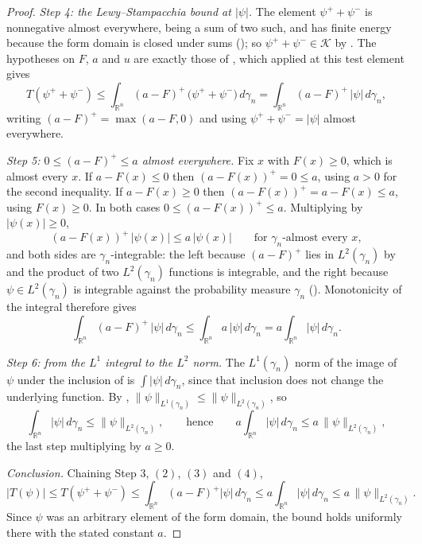 \begin{proof}
\emph{Step 4: the Lewy--Stampacchia bound at $|\psi|$.}
The element $\psi^+ + \psi^-$ is nonnegative almost everywhere, being a sum of two
such, and has finite energy because the form domain is closed under sums
(); so $\psi^+ + \psi^- \in \mathcal{K}$ by
.  The hypotheses on $F$, $a$ and $u$ are exactly those of
, which applied at this test element gives
\begin{equation*}
  T(\psi^+ + \psi^-)
    \leq \int_{\mathbb{R}^n} (a - F)^+ \,\bigl(\psi^+ + \psi^-\bigr) \, d\gamma_n
    = \int_{\mathbb{R}^n} (a - F)^+ \,|\psi| \, d\gamma_n , \tag{2}
\end{equation*}
writing $(a-F)^+ = \max(a-F, 0)$ and using $\psi^+ + \psi^- = |\psi|$ almost
everywhere.

\emph{Step 5: $0 \leq (a-F)^+ \leq a$ almost everywhere.}
Fix $x$ with $F(x) \geq 0$, which is almost every $x$.  If $a - F(x) \leq 0$ then
$(a - F(x))^+ = 0 \leq a$, using $a > 0$ for the second inequality.  If
$a - F(x) \geq 0$ then $(a-F(x))^+ = a - F(x) \leq a$, using $F(x) \geq 0$.  In
both cases $0 \leq (a - F(x))^+ \leq a$.  Multiplying by $|\psi(x)| \geq 0$,
\[
  (a-F(x))^+\,|\psi(x)| \leq a\,|\psi(x)|
  \qquad \text{for } \gamma_n\text{-almost every } x ,
\]
and both sides are $\gamma_n$-integrable: the left because $(a-F)^+$ lies in
$L^2(\gamma_n)$ by  and the product of two
$L^2(\gamma_n)$ functions is integrable, and the right because $\psi \in
L^2(\gamma_n)$ is integrable against the probability measure $\gamma_n$
().  Monotonicity of the integral therefore gives
\begin{equation*}
  \int_{\mathbb{R}^n} (a-F)^+\,|\psi| \, d\gamma_n
    \leq \int_{\mathbb{R}^n} a\,|\psi| \, d\gamma_n
    = a \int_{\mathbb{R}^n} |\psi| \, d\gamma_n . \tag{3}
\end{equation*}

\emph{Step 6: from the $L^1$ integral to the $L^2$ norm.}
The $L^1(\gamma_n)$ norm of the image of $\psi$ under the inclusion of
 is $\int |\psi| \, d\gamma_n$, since that inclusion does not change
the underlying function.  By ,
$\|\psi\|_{L^1(\gamma_n)} \leq \|\psi\|_{L^2(\gamma_n)}$, so
\begin{equation*}
  \int_{\mathbb{R}^n} |\psi| \, d\gamma_n \leq \|\psi\|_{L^2(\gamma_n)} ,
  \qquad\text{hence}\qquad
  a \int_{\mathbb{R}^n} |\psi| \, d\gamma_n \leq a\,\|\psi\|_{L^2(\gamma_n)} ,
  \tag{4}
\end{equation*}
the last step multiplying by $a \geq 0$.

\emph{Conclusion.}
Chaining Step 3, $(2)$, $(3)$ and $(4)$,
\[
  |T(\psi)|
    \leq T(\psi^+ + \psi^-)
    \leq \int_{\mathbb{R}^n} (a-F)^+ |\psi| \, d\gamma_n
    \leq a \int_{\mathbb{R}^n} |\psi| \, d\gamma_n
    \leq a\,\|\psi\|_{L^2(\gamma_n)} .
\]
Since $\psi$ was an arbitrary element of the form domain, the bound holds uniformly
there with the stated constant $a$.
\end{proof}
